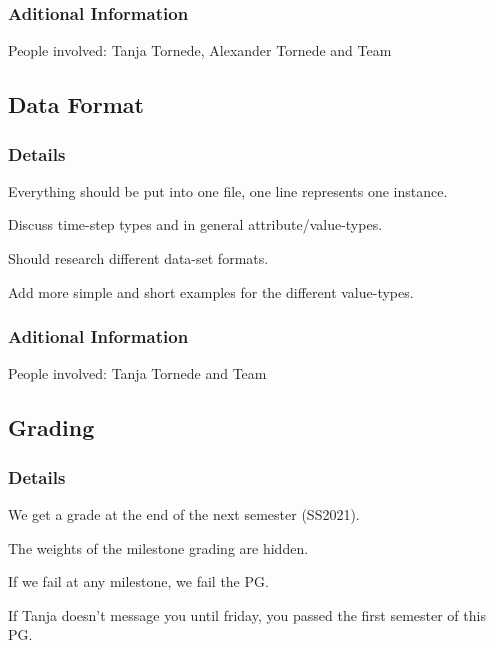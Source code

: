 \documentclass[11pt]{meetingmins} %
\begin{document}
	\subsubsection{Aditional Information}
		\begin{hiddensubitems}
			\item People involved: Tanja Tornede, Alexander Tornede and Team
		\end{hiddensubitems}
\subsection{Data Format}
	\subsubsection{Details}
		\begin{hiddensubitems}
			\item Everything should be put into one file, one line represents one instance.
			\item Discuss time-step types and in general attribute/value-types.
			\item Should research different data-set formats.
			\item Add more simple and short examples for the different value-types.
		\end{hiddensubitems}
	\subsubsection{Aditional Information}
		\begin{hiddensubitems}
			\item People involved: Tanja Tornede and Team
		\end{hiddensubitems}
\subsection{Grading}
	\subsubsection{Details}
		\begin{hiddensubitems}
			\item We get a grade at the end of the next semester (SS2021).
			\item The weights of the milestone grading are hidden.
			\item If we fail at any milestone, we fail the PG.
			\item If Tanja doesn't message you until friday, you passed the first semester of this PG.
		\end{hiddensubitems}
\end{document}
